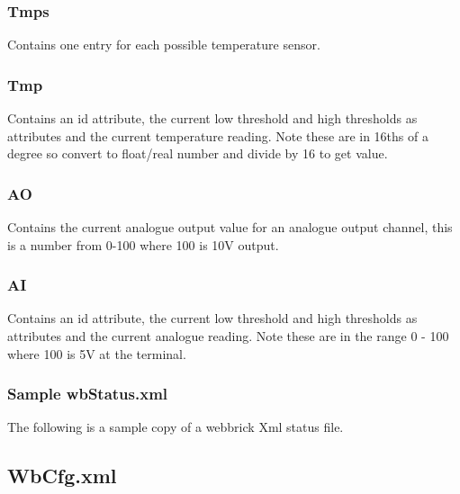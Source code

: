 \subsubsection {Tmps}
Contains one entry for each possible temperature sensor.

\subsubsection {Tmp}
Contains an id attribute, the current low threshold and high thresholds as attributes and the 
current temperature reading. Note these are in 16ths of a degree so convert to float/real number and 
divide by 16 to get value.

\subsubsection {AO}
Contains the current analogue output value for an analogue output channel, this is a number from 0-100 where 100
is 10V output.

\subsubsection {AI}
Contains an id attribute, the current low threshold and high thresholds as attributes and the 
current analogue reading. Note these are in the range 0 - 100 where 100 is 5V at the terminal.

\subsubsection {Sample wbStatus.xml}
The following is a sample copy of a webbrick Xml status file.



\subsection {WbCfg.xml}

